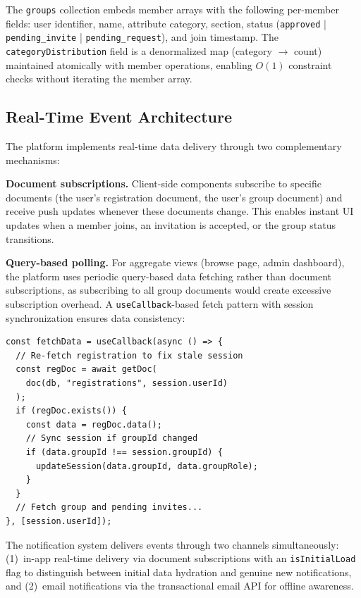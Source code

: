 \documentclass[11pt,a4paper]{article}
\theoremstyle{plain}
\theoremstyle{definition}
\begin{document}
The \texttt{groups} collection embeds member arrays with the following per-member fields: user identifier, name, attribute category, section, status (\texttt{approved} | \texttt{pending\_invite} | \texttt{pending\_request}), and join timestamp. The \texttt{categoryDistribution} field is a denormalized map (category $\rightarrow$ count) maintained atomically with member operations, enabling $O(1)$ constraint checks without iterating the member array.

\subsection{Real-Time Event Architecture}

The platform implements real-time data delivery through two complementary mechanisms:

\textbf{Document subscriptions.} Client-side components subscribe to specific documents (the user's registration document, the user's group document) and receive push updates whenever these documents change. This enables instant UI updates when a member joins, an invitation is accepted, or the group status transitions.

\textbf{Query-based polling.} For aggregate views (browse page, admin dashboard), the platform uses periodic query-based data fetching rather than document subscriptions, as subscribing to all group documents would create excessive subscription overhead. A \texttt{useCallback}-based fetch pattern with session synchronization ensures data consistency:

\begin{lstlisting}[language={}, caption={Session synchronization pattern}, label={lst:sessionsync}]
const fetchData = useCallback(async () => {
  // Re-fetch registration to fix stale session
  const regDoc = await getDoc(
    doc(db, "registrations", session.userId)
  );
  if (regDoc.exists()) {
    const data = regDoc.data();
    // Sync session if groupId changed
    if (data.groupId !== session.groupId) {
      updateSession(data.groupId, data.groupRole);
    }
  }
  // Fetch group and pending invites...
}, [session.userId]);
\end{lstlisting}

The notification system delivers events through two channels simultaneously: (1)~in-app real-time delivery via document subscriptions with an \texttt{isInitialLoad} flag to distinguish between initial data hydration and genuine new notifications, and (2)~email notifications via the transactional email API for offline awareness.
\end{document}
